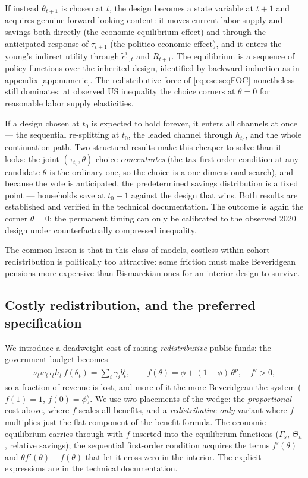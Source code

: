  If instead $\theta_{t+1}$ is chosen at $t$, the design becomes a state variable at $t+1$ and acquires genuine forward-looking content: it moves current labor supply and savings both directly (the economic-equilibrium effect) and through the anticipated response of $\tau_{t+1}$ (the politico-economic effect), and it enters the young's indirect utility through $\tilde{c}_{1,t}^i$ and $R_{t+1}$. The equilibrium is a sequence of policy functions over the inherited design, identified by backward induction as in appendix \ref{app:numeric}. The redistributive force of \eqref{eq:esc:seqFOC} nonetheless still dominates: at observed US inequality the choice corners at $\theta = 0$ for reasonable labor supply elasticities.

 If a design chosen at $t_0$ is expected to hold forever, it enters all channels at once --- the sequential re-splitting at $t_0$, the leaded channel through $h_{t_0}$, and the whole continuation path. Two structural results make this cheaper to solve than it looks: the joint $(\tau_{t_0},\theta)$ choice \emph{concentrates} (the tax first-order condition at any candidate $\theta$ is the ordinary one, so the choice is a one-dimensional search), and because the vote is anticipated, the predetermined savings distribution is a fixed point --- households save at $t_0-1$ against the design that wins. Both results are established and verified in the technical documentation. The outcome is again the corner $\theta = 0$; the permanent timing can only be calibrated to the observed 2020 design under counterfactually compressed inequality.

The common lesson is that in this class of models, costless within-cohort redistribution is politically too attractive: some friction must make Beveridgean pensions more expensive than Bismarckian ones for an interior design to survive.

\subsection{Costly redistribution, and the preferred specification}
We introduce a deadweight cost of raising \emph{redistributive} public funds: the government budget becomes
\begin{align}\label{eq:esc:budget}
    \nu_t w_t\tau_th_t\, f(\theta_t) = \sum_i \gamma_i b_t^i, \qquad f(\theta) = \phi + (1-\phi)\,\theta^{p}, \quad f'>0,
\end{align}
so a fraction of revenue is lost, and more of it the more Beveridgean the system ($f(1)=1$, $f(0)=\phi$). We use two placements of the wedge: the \emph{proportional} cost above, where $f$ scales all benefits, and a \emph{redistributive-only} variant where $f$ multiplies just the flat component of the benefit formula. The economic equilibrium carries through with $f$ inserted into the equilibrium functions ($\Gamma_{s}$, $\Theta_{h}$, relative savings); the sequential first-order condition acquires the terms $f'(\theta)$ and $\theta f'(\theta) + f(\theta)$ that let it cross zero in the interior. The explicit expressions are in the technical documentation.

